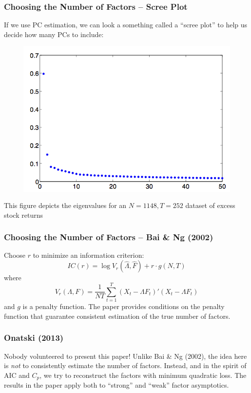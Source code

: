 \documentclass[handout]{beamer}
\begin{document}
\begin{frame}[c]\frametitle{Choosing the Number of Factors -- Scree Plot}
    
If we use PC estimation, we can look a something called a ``scree plot'' to help us decide how many PCs to include:
\begin{figure}
	\centering
	\includegraphics[scale =0.3]{scree}
\end{figure}
This figure depicts the eigenvalues for an $N=1148, T = 252$ dataset of excess stock returns
\end{frame}
\begin{frame}
	\frametitle{Choosing the Number of Factors -- Bai \& Ng (2002)}

Choose $r$ to minimize an information criterion:
$$IC(r) = \log V_r(\widehat{\Lambda}, \widehat{F}) + r \cdot g(N,T)$$
where
	$$V_r(\Lambda, F) = \frac{1}{NT}\sum_{t=1}^T (X_t - \Lambda F_t)'(X_t - \Lambda F_t)$$
and $g$ is a penalty function. The paper provides conditions on the penalty function that guarantee consistent estimation of the true number of factors. 
\end{frame}
\begin{frame}
	\frametitle{Onatski (2013)}
	Nobody volunteered to present this paper! Unlike Bai \& Ng (2002), the idea here is \emph{not} to consistently estimate the number of factors. Instead, and in the spirit of AIC and $C_p$, we try to reconstruct the factors with minimum quadratic loss. The results in the paper apply both to ``strong'' and ``weak'' factor asymptotics.
\end{frame}
\end{document}
